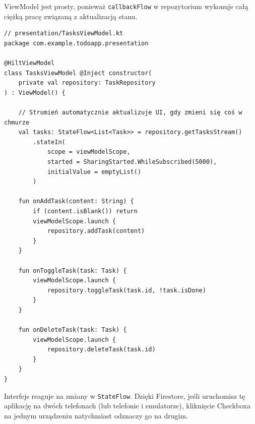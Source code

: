 ViewModel jest prosty, ponieważ \texttt{callbackFlow} w repozytorium wykonuje całą ciężką pracę związaną z aktualizacją stanu.

\begin{verbatim}
// presentation/TasksViewModel.kt
package com.example.todoapp.presentation

@HiltViewModel
class TasksViewModel @Inject constructor(
    private val repository: TaskRepository
) : ViewModel() {

    // Strumień automatycznie aktualizuje UI, gdy zmieni się coś w chmurze
    val tasks: StateFlow<List<Task>> = repository.getTasksStream()
        .stateIn(
            scope = viewModelScope,
            started = SharingStarted.WhileSubscribed(5000),
            initialValue = emptyList()
        )

    fun onAddTask(content: String) {
        if (content.isBlank()) return
        viewModelScope.launch {
            repository.addTask(content)
        }
    }

    fun onToggleTask(task: Task) {
        viewModelScope.launch {
            repository.toggleTask(task.id, !task.isDone)
        }
    }

    fun onDeleteTask(task: Task) {
        viewModelScope.launch {
            repository.deleteTask(task.id)
        }
    }
}
\end{verbatim}

Interfejs reaguje na zmiany w \texttt{StateFlow}. Dzięki Firestore, jeśli uruchomisz tę aplikację na dwóch telefonach (lub telefonie i emulatorze), kliknięcie Checkboxa na jednym urządzeniu natychmiast odznaczy go na drugim.


